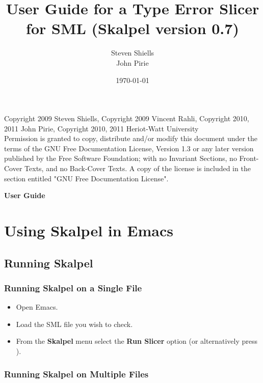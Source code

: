 \documentclass{article}
\title{User Guide for a Type Error Slicer for SML (Skalpel version 0.7)}
\author{Steven Shiells\\ John Pirie}
\date{\today}
\begin{document}
\maketitle
\vspace{110mm}
\small{
\noindent Copyright 2009 Steven Shiells, Copyright 2009 Vincent Rahli, Copyright 2010, 2011 John Pirie, Copyright 2010, 2011 Heriot-Watt University
\\
Permission is granted to copy, distribute and/or modify this document
under the terms of the GNU Free Documentation License, Version 1.3 or
any later version published by the Free Software Foundation; with no
Invariant Sections, no Front-Cover Texts, and no Back-Cover Texts.  A
copy of the license is included in the section entitled "GNU Free
Documentation License".}

\newpage

\tableofcontents

\newpage
\textbf{\LARGE User Guide}

\section{Using Skalpel in Emacs}


\subsection{Running Skalpel}


\subsubsection{Running Skalpel on a Single File}

\begin{itemize}
\item Open Emacs.
\item Load the SML file you wish to check.
\item From the \textbf{Skalpel} menu select the \textbf{Run Slicer}
  option (or alternatively press ).
\end{itemize}

\subsubsection{Running Skalpel on Multiple Files}
\end{document}
